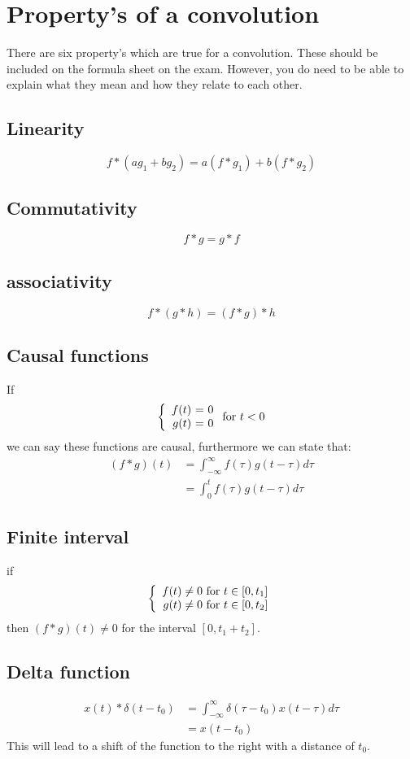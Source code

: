 \documentclass[]{subfiles}
\begin{document}
	\section{Property's of a convolution}
	 There are six property's which are true for a convolution. These should be included on the formula sheet on the exam. However, you do need to be able to explain what they mean and how they relate to each other.
	 \subsection{Linearity}
	 \begin{equation}
	 	f\ast (ag_1+bg_2)= a(f\ast g_1)  +b(f\ast g_2)
	 \end{equation}
 	\subsection{Commutativity}
 	\begin{equation}
 		f\ast g = g \ast f
 	\end{equation}
 \subsection{associativity}
 \begin{equation}
 	f\ast (g\ast h) = (f\ast g) \ast h
 \end{equation}
\subsection{Causal functions}
\label{sec:causalFunctions}
If
\begin{equation}
	\left\{ \begin{array}{r@{\text{ = }}l}
		f(t)& 0\\
		g(t)&0
	\end{array}\right.
	\text{for } t<0
\end{equation}
we can say these functions are causal, furthermore we can state that:
\begin{align*}
	(f\ast g) (t) &= \int_{-\infty}^{\infty} f(\tau)g(t-\tau)d\tau\\
	&= \int_{0}^{t}f(\tau)g(t-\tau)d\tau
\end{align*}
\subsection{Finite interval}
if
\begin{equation}
	\left\{ \begin{array}{r@{\text{ for }}l}
		f(t)\neq 0& t\in\left[ 0,t_1\right] \\
		g(t)\neq 0&t\in \left[ 0,t_2\right] 
	\end{array}\right.
\end{equation}
then $(f\ast g)(t)\neq 0$ for the interval $\left[0,t_1+t_2 \right] $.
\subsection{Delta function}
\begin{align*}
	x(t)\ast \delta(t-t_0) &= \int_{-\infty}^{\infty}\delta(\tau-t_0)x(t-\tau)d\tau\\
	&=  x(t-t_0)
\end{align*}
This will lead to a shift of the function to the right with a distance of $t_0$. 
\end{document}
